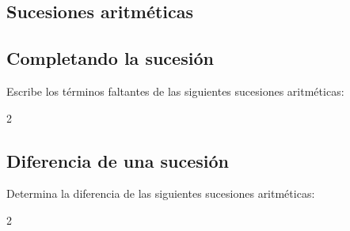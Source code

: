 \documentclass[12pt,addpoints]{evalua}
\begin{document}
\begin{questions}
	\section*{Sucesiones aritméticas}
      
	\subsection*{Completando la sucesión}
    
      \question[4] Escribe los términos faltantes de las siguientes sucesiones aritméticas:
    
      \begin{multicols}{2}
      \end{multicols}


      
	\subsection*{Diferencia de una sucesión}

      \question[4] Determina la diferencia de las siguientes sucesiones aritméticas:
      
      \begin{multicols}{2}
            \begin{parts}

\end{parts}
\end{multicols}
\end{questions}
\end{document}
